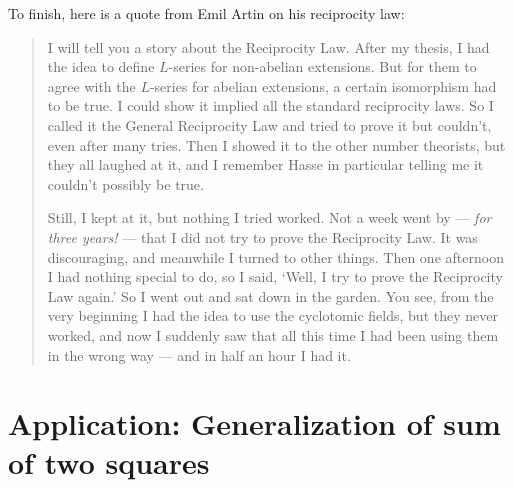 \bigskip

To finish, here is a quote from Emil Artin on his reciprocity law:
\begin{quote}
	I will tell you a story about the Reciprocity Law.
	After my thesis, I had the idea to define $L$-series
	for non-abelian extensions. But for them to agree
	with the $L$-series for abelian extensions,
	a certain isomorphism had to be true.
	I could show it implied all the standard reciprocity laws.
	So I called it the General Reciprocity Law and tried to prove it but couldn't,
	even after many tries. Then I showed it to the other number theorists,
	but they all laughed at it, and I remember Hasse in particular
	telling me it couldn't possibly be true.

	Still, I kept at it, but nothing I tried worked.
	Not a week went by --- \emph{for three years!} ---
	that I did not try to prove the Reciprocity Law.
	It was discouraging, and meanwhile I turned to other things.
	Then one afternoon I had nothing special to do, so I said,
	`Well, I try to prove the Reciprocity Law again.'
	So I went out and sat down in the garden.  You see,
	from the very beginning I had the idea to use the cyclotomic fields,
	but they never worked, and now I suddenly saw that all this time
	I had been using them in the wrong way
	--- and in half an hour I had it.
\end{quote}

\section{Application: Generalization of sum of two squares}

